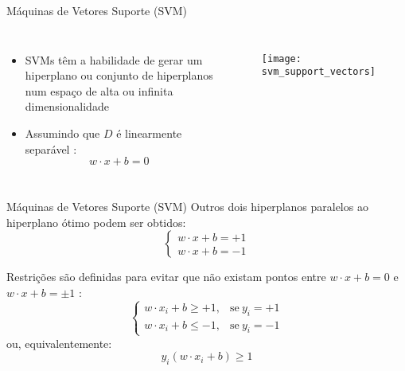 \begin{frame}{Máquinas de Vetores Suporte (SVM)}
\begin{columns}
\begin{itemize}
    \item SVMs têm a habilidade de gerar um hiperplano ou conjunto de hiperplanos num espaço de alta ou infinita dimensionalidade \citep{duda:12}
    \item Assumindo que $D$ é linearmente separável \citep{lorena:03}:
\begin{equation*}
w \cdot x + b = 0
\end{equation*}
\end{itemize}

\begin{figure}[!h]
  \centering
  \texttt{[image: svm\_support\_vectors]}
\end{figure}
\end{columns}

\end{frame}

\begin{frame}{Máquinas de Vetores Suporte (SVM)}
Outros dois hiperplanos paralelos ao hiperplano ótimo podem ser obtidos:
\begin{equation*}
\begin{cases}
    w \cdot x + b = +1\\
    w \cdot x + b = -1
\end{cases}
\end{equation*}

Restrições são definidas para evitar que não existam pontos entre $w \cdot x + b = 0$ e $w \cdot x + b = \pm 1$ \citep{lorena:03}:
\begin{equation*}
\begin{cases}
    w \cdot x_i + b \geq +1, & \text{se}\ y_i = +1\\
    w \cdot x_i + b \leq -1, & \text{se}\ y_i = -1
\end{cases}
\end{equation*}
\noindent ou, equivalentemente:
\begin{equation*}
    y_i (w \cdot x_i + b) \geq 1
\end{equation*}
\end{frame}

